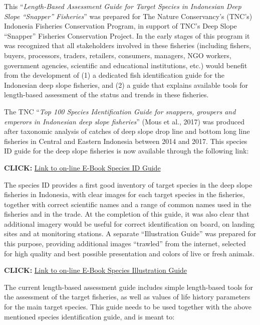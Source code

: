 This ``\textit{Length-Based Assessment Guide for Target Species in Indonesian Deep Slope ``Snapper'' Fisheries}'' was prepared for The Nature Conservancy's (TNC's) Indonesia Fisheries Conservation Program, in support of TNC's Deep Slope ``Snapper'' Fisheries Conservation Project. In the early stages of this program it was recognized that all stakeholders involved in these fisheries (including fishers, buyers, processors, traders, retailers, consumers, managers, NGO workers, government agencies, scientific and educational institutions, etc.) would benefit from the development of (1) a dedicated fish identification guide for the Indonesian deep slope fisheries, and (2) a guide that explains available tools for length-based assessment of the status and trends in these fisheries.

The TNC ``\textit{Top 100 Species Identification Guide for snappers, groupers and emperors in Indonesian deep slope fisheries}'' (Mous et al., 2017) was produced after taxonomic analysis of catches of deep slope drop line and bottom long line fisheries in Central and Eastern Indonesia between 2014 and 2017. This species ID guide for the deep slope fisheries is now available through the following link:

\textbf{CLICK: }\href{http://72.14.187.103:8080/ifish/pub/TNC_FishID.pdf}{Link to on-line E-Book Species ID Guide}

The species ID provides a first good inventory of target species in the deep slope fisheries in Indonesia, with clear images for each target species in the fisheries, together with correct scientific names and a range of common names used in the fisheries and in the trade. At the completion of this guide, it was also clear that additional imagery would be useful for correct identification on board, on landing sites and at monitoring stations. A separate ``Illustration Guide'' was prepared for this purpose, providing additional images ``trawled'' from the internet, selected for high quality and best possible presentation and colors of live or fresh animals.

\textbf{CLICK: }\href{http://72.14.187.103:8080/ifish/pub/DeepSlopeSpeciesIllustrationGuide.pdf}{Link to on-line E-Book Species Illustration  Guide}

The current length-based assessment guide includes simple length-based tools for the assessment of the target fisheries, as well as values of life history parameters for the main target species. This guide needs to be used together with the above mentioned species identification guide, and is meant to:

